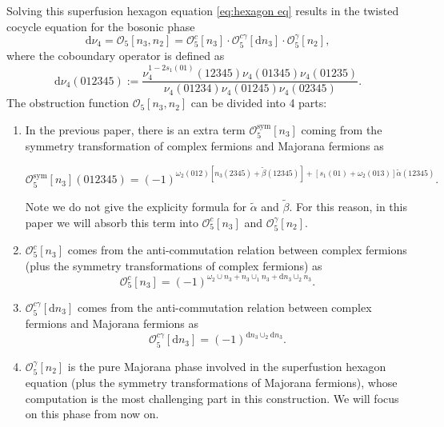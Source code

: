 \documentclass[%
 reprint,
 amsmath,amssymb,
 aps,
prb,
]{revtex4-2}
\begin{document}
Solving this superfusion hexagon equation \eqref{eq:hexagon eq} results in the twisted cocycle equation for the bosonic phase 
\begin{equation}
\mathrm{d} \nu_4 = \mathcal{O}_5[n_3,n_2] = \mathcal{O}^{c}_5[n_3] \cdot \mathcal{O}^{c\gamma}_5[\mathrm{d}n_3] \cdot \mathcal{O}^{\gamma}_5[n_2] ,\label{eq:O5 obstrution}
\end{equation}
where the coboundary operator is defined as 
\begin{equation}
\mathrm{d} \nu_4(012345) := \frac{\nu _{4} ^{1-2s_{1}( 01)}( 12345) \nu _{4}( 01345) \nu _{4}( 01235)}{\nu _{4}( 01234) \nu _{4}( 01245) \nu _{4}( 02345)} .
\end{equation}
The obstruction function $\mathcal{O}_5[n_3,n_2]$ can be divided into 4 parts: 
\begin{enumerate}
\item In the previous paper, there is an extra term $\mathcal{O}^{\mathrm{sym}}_5[n_3]$ coming from the symmetry transformation of complex fermions and Majorana fermions as 
\begin{widetext}
\begin{equation}
\mathcal{O}^{\mathrm{sym}}_5[n_3] (012345) = (-1)^{\omega_2(012) [n_3(2345) + \tilde{\beta}(12345)] + [s_1(01) +\omega_2(013)] \tilde{\alpha}(12345)} .
\end{equation}
\end{widetext}
Note we do not give the explicity formula for $\tilde{\alpha}$ and $\tilde{\beta}$.
For this reason, in this paper we will absorb this term into $\mathcal{O}^{c}_5[n_3]$ and $\mathcal{O}^{\gamma}_5[n_2]$.
\item $\mathcal{O}^{c}_5[n_3]$ comes from the anti-commutation relation between complex fermions (plus the symmetry transformations of complex fermions) as 
\begin{equation}
\mathcal{O}^{c}_5[n_3] = (-1)^{\omega_2 \cup n_3 + n_3 \cup_1 n_3 + \mathrm{d}n_3 \cup_2 n_3} .\label{eq:O5 obstruction c}
\end{equation}
\item $\mathcal{O}^{c\gamma}_5[\mathrm{d}n_3]$ comes from the anti-commutation relation between complex fermions and Majorana fermions as 
\begin{equation}
\mathcal{O}^{c\gamma}_5[\mathrm{d}n_3] = (-1)^{\mathrm{d}n_3 \cup_2 \mathrm{d}n_3} .\label{eq:O5 obstruction cgamma}
\end{equation}
\item $\mathcal{O}^{\gamma}_5[n_2]$ is the pure Majorana phase involved in the superfustion hexagon equation (plus the symmetry transformations of Majorana fermions), whose computation is the most challenging part in this construction. We will focus on this phase from now on.
\end{enumerate}
\end{document}
